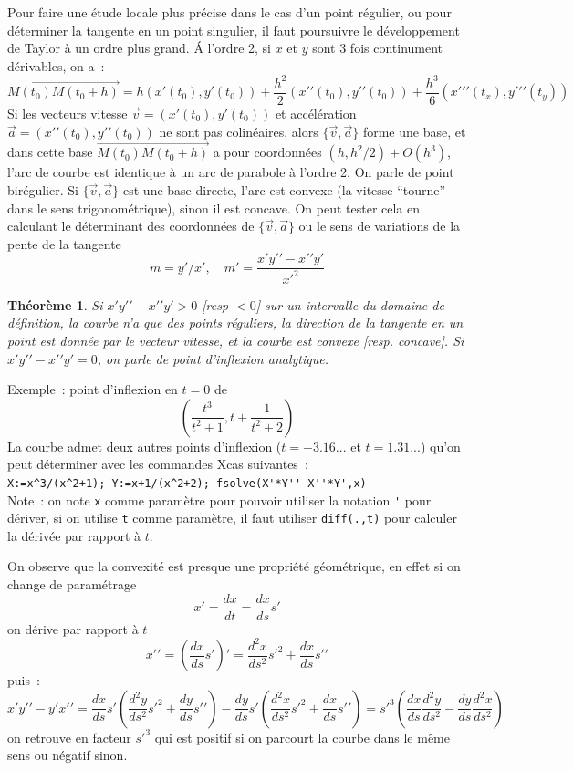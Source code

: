 \documentclass[a4paper,11pt]{article}
\newtheorem{thm}{Théorème}
\begin{document}
Pour faire une \'etude locale plus pr\'ecise dans le cas d'un point
r\'egulier, ou pour d\'eterminer la tangente en un point singulier,
il faut poursuivre le d\'eveloppement de Taylor \`a un ordre plus
grand. \'A l'ordre 2, si $x$ et $y$ sont 3 fois continument
d\'erivables, on a~:
$$\overrightarrow{M(t_0)M(t_0+h)}= 
h (x'(t_0),y'(t_0))+\frac{h^2}{2}(x'{'}(t_0),y'{'}(t_0))
+\frac{h^3}{6}(x'{'}'(t_x),y'{'}'(t_y))
$$
Si les vecteurs vitesse $\overrightarrow{v}=(x'(t_0),y'(t_0))$
et acc\'el\'eration $\overrightarrow{a}=(x'{'}(t_0),y'{'}(t_0))$
ne sont pas colin\'eaires, 
alors $\{\overrightarrow{v},\overrightarrow{a}\}$ forme 
une base, et dans cette base $\overrightarrow{M(t_0)M(t_0+h)}$
a pour coordonn\'ees $(h,h^2/2)+O(h^3)$, l'arc
de courbe est identique \`a un arc de parabole \`a l'ordre 2. 
On parle de point bir\'egulier.
Si $\{\overrightarrow{v},\overrightarrow{a}\}$ est une base directe,
l'arc est convexe (la vitesse
``tourne'' dans le sens trigonom\'etrique),
sinon il est concave. On peut tester cela en calculant
le d\'eterminant des coordonn\'ees de $\{\overrightarrow{v},\overrightarrow{a}\}$ ou le sens
de variations de la pente de la tangente 
\[ m=y'/x', \quad m'=\frac{x'y'{'}-x'{'}y'}{x'^2} \]

\begin{thm}
Si $x'y'{'}-x'{'}y'>0$ [resp $<0$] sur un intervalle du domaine de d\'efinition,
la courbe n'a que des points r\'eguliers, la direction de la tangente en un point
est donn\'ee par le vecteur vitesse, et la courbe est convexe
[resp. concave].
Si $x'y'{'}-x'{'}y'=0$, on parle de point d'inflexion analytique.
\end{thm}

Exemple~: point d'inflexion en $t=0$ de
$$ (\frac{t^3}{t^2+1},t+\frac{1}{t^2+2}) $$
La courbe admet deux autres points d'inflexion ($t=-3.16...$ et
$t=1.31...$) qu'on peut d\'eterminer avec les commandes Xcas suivantes~:\\
\verb|X:=x^3/(x^2+1); Y:=x+1/(x^2+2); fsolve(X'*Y''-X''*Y',x)|\\
Note~: on note \verb|x| comme param\`etre pour pouvoir 
utiliser la notation \verb|'| pour d\'eriver, si on utilise \verb|t|
comme param\`etre, il faut utiliser \verb|diff(.,t)| pour calculer
la d\'eriv\'ee par rapport \`a $t$.

On observe que la convexit\'e est presque une propri\'et\'e g\'eom\'etrique,
en effet si on change de param\'etrage
$$ x'=\frac{dx}{dt} =\frac{dx}{ds} s' $$
on d\'erive par rapport \`a $t$
$$ x'{'} = (\frac{dx}{ds} s')'=\frac{d^2x}{ds^2} s'^2 + \frac{dx}{ds}
s'{'} $$
puis~:
$$ x'y'{'}- y' x'{'} = 
\frac{dx}{ds} s' (\frac{d^2y}{ds^2} s'^2 +\frac{dy}{ds} s'{'} ) - 
\frac{dy}{ds} s' (\frac{d^2x}{ds^2} s'^2 +\frac{dx}{ds} s'{'} ) 
= s'^3 (\frac{dx}{ds} \frac{d^2y}{ds^2} - 
\frac{dy}{ds} \frac{d^2x}{ds^2} )
 $$
on retrouve en facteur $s'^3$ qui est positif si on parcourt la courbe
dans le m\^eme sens ou n\'egatif sinon.
\end{document}
